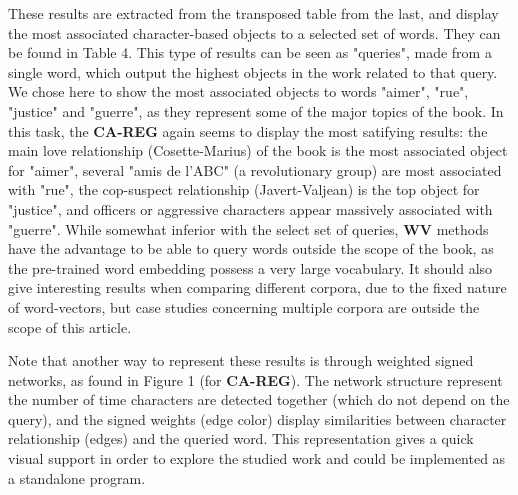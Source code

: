 \documentclass[
twocolumn,
]{ceurart}
\begin{document}
These results are extracted from the transposed table from the last, and display the most associated character-based objects to a selected set of words. They can be found in Table 4. This type of results can be seen as "queries", made from a single word, which output the highest objects in the work related to that query. We chose here to show the most associated objects to words "aimer", "rue", "justice" and "guerre", as they represent some of the major topics of the book. In this task, the \textbf{CA-REG} again seems to display the most satifying results: the main love relationship (Cosette-Marius) of the book is the most associated object for "aimer", several "amis de l'ABC" (a revolutionary group) are most associated with "rue", the cop-suspect relationship (Javert-Valjean) is the top object for "justice", and officers or aggressive characters appear massively associated with "guerre". While somewhat inferior with the select set of queries, \textbf{WV} methods have the advantage to be able to query words outside the scope of the book, as the pre-trained word embedding possess a very large vocabulary. It should also give interesting results when comparing different corpora, due to the fixed nature of word-vectors, but case studies concerning multiple corpora are outside the scope of this article.

Note that another way to represent these results is through weighted signed networks, as found in Figure 1 (for \textbf{CA-REG}). The network structure represent the number of time characters are detected together (which do not depend on the query), and the signed weights (edge color) display similarities between character relationship (edges) and the queried word. This representation gives a quick visual support in order to explore the studied work and could be implemented as a standalone program.


\end{document}
